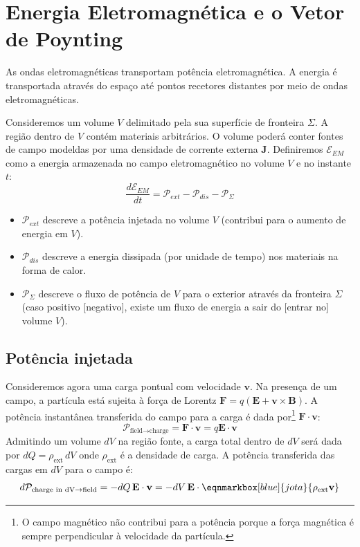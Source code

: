 \clearpage
\section{Energia Eletromagnética e o Vetor de Poynting}

As ondas eletromagnéticas transportam potência eletromagnética. A energia é transportada através do espaço até pontos recetores distantes por meio de ondas eletromagnéticas.

Consideremos um volume $V$ delimitado pela sua superfície de fronteira $\Sigma$. A região dentro de $V$ contém materiais arbitrários. O volume poderá conter fontes de campo modeldas por uma densidade de corrente externa $\mathbf{J}$. Definiremos $\mathcal{E}_{EM}$ como a energia armazenada no campo eletromagnético no volume $V$ e no instante $t$:
\begin{equation}
    \frac{d\mathcal{E}_{EM}}{dt} = \mathcal{P}_{ext} - \mathcal{P}_{dis} - \mathcal{P}_{\Sigma}
\end{equation}
\begin{itemize}
    \item $\mathcal{P}_{ext}$ descreve a potência injetada no volume $V$ (contribui para o aumento de energia em $V$).
    \item $\mathcal{P}_{dis}$ descreve a energia dissipada (por unidade de tempo) nos materiais na forma de calor.
    \item $\mathcal{P}_{\Sigma}$ descreve o fluxo de potência de $V$ para o exterior através da fronteira $\Sigma$ (caso positivo $[$negativo$]$, existe um fluxo de energia a sair do $[$entrar no$]$ volume $V$).
\end{itemize}

\subsection{Potência injetada}
Consideremos agora uma carga pontual com velocidade $\mathbf{v}$. Na presença de um campo, a partícula está sujeita à força de Lorentz $\mathbf{F} = q(\mathbf{E} + \mathbf{v} \times \mathbf{B})$. A potência instantânea transferida do campo para a carga é dada por\footnote{O campo magnético não contribui para a potência porque a força magnética é sempre perpendicular à velocidade da partícula.} $\mathbf{F} \cdot \mathbf{v}$:
\begin{equation}
    \mathcal{P}_{\text{field}\rightarrow\text{charge}} = \mathbf{F} \cdot \mathbf{v} = q \mathbf{E}\cdot\mathbf{v}
\end{equation}
Admitindo um volume $dV$ na região fonte, a carga total dentro de $dV$ será dada por $dQ = \rho_{\text{ext}}\,dV$ onde ${\rho_\text{ext}}$ é a densidade de carga. A potência transferida das cargas em $dV$ para o campo é:
\begin{equation}\label{eq:power-trans}
    d\mathcal{P}_{\text{charge in dV}\rightarrow\text{field}} = -dQ\, \mathbf{E} \cdot \mathbf{v} = -dV\, \mathbf{E} \cdot \eqnmarkbox[blue]{jota}{\rho_{\text{ext}} \mathbf{v}}
\end{equation}

